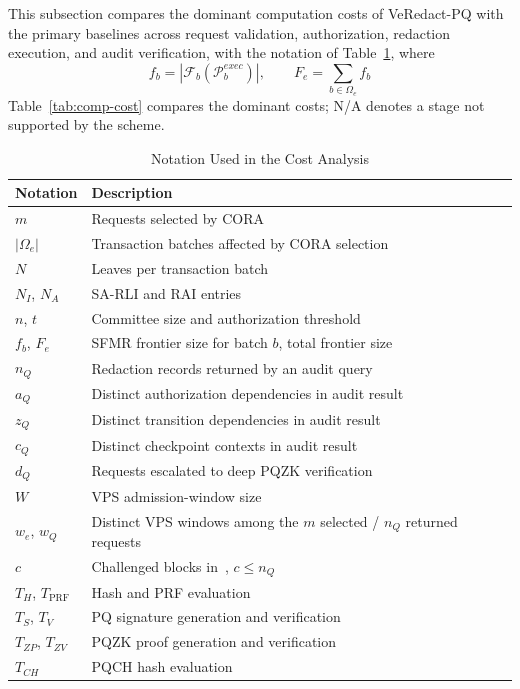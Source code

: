 \documentclass[lettersize,journal]{IEEEtran}
\begin{document}
This subsection compares the dominant computation costs of VeRedact-PQ
with the primary baselines across request validation, authorization,
redaction execution, and audit verification, with the notation of
Table~\ref{tab:cost-notation}, where
\begin{equation}
f_b=|\mathcal{F}_b(\mathcal{P}_b^{exec})|,\qquad
F_e=\sum_{b\in\Omega_e}f_b
\end{equation}
Table~\ref{tab:comp-cost} compares the dominant costs; N/A denotes a
stage not supported by the scheme.

\begin{table}[t]
\centering
\caption{Notation Used in the Cost Analysis}
\label{tab:cost-notation}
\scriptsize
\renewcommand{\arraystretch}{1.08}
\setlength{\tabcolsep}{3pt}
\begin{tabular}{ll}
\hline
\textbf{Notation} & \textbf{Description} \\
\hline
$m$ & Requests selected by CORA \\
$|\Omega_e|$ & Transaction batches affected by CORA selection \\
$N$ & Leaves per transaction batch \\
$N_I$, $N_A$ & SA-RLI and RAI entries \\
$n$, $t$ & Committee size and authorization threshold \\
$f_b$, $F_e$ & SFMR frontier size for batch $b$, total frontier size \\
$n_Q$ & Redaction records returned by an audit query \\
$a_Q$ & Distinct authorization dependencies in audit result \\
$z_Q$ & Distinct transition dependencies in audit result \\
$c_Q$ & Distinct checkpoint contexts in audit result \\
$d_Q$ & Requests escalated to deep PQZK verification \\
$W$ & VPS admission-window size \\
$w_e$, $w_Q$ & Distinct VPS windows among the $m$ selected / $n_Q$ returned requests \\
$c$ & Challenged blocks in~\cite{ref13}, $c\le n_Q$ \\
\hline
$T_H$, $T_{\mathrm{PRF}}$ & Hash and PRF evaluation \\
$T_S$, $T_V$ & PQ signature generation and verification \\
$T_{ZP}$, $T_{ZV}$ & PQZK proof generation and verification \\
$T_{CH}$ & PQCH hash evaluation \\

\end{tabular}
\end{table}
\end{document}
